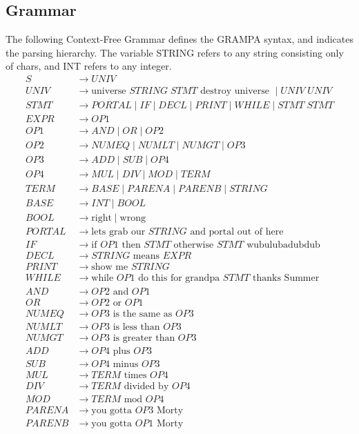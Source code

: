 \documentclass[numbers]{sigplanconf}
\begin{document}
\subsection*{Grammar}
The following Context-Free Grammar defines the GRAMPA syntax, and indicates the parsing hierarchy. The variable STRING refers to any string consisting only of chars, and INT refers to any integer.
\begin{align*}
	S &\rightarrow UNIV \\
	UNIV &\rightarrow \text{universe } STRING \; STMT \text{ destroy universe } \mid UNIV \; UNIV \\
	STMT &\rightarrow PORTAL \mid IF \mid DECL \mid PRINT \mid WHILE \mid STMT \; STMT \\
	EXPR &\rightarrow OP1 \\
	OP1 &\rightarrow AND \mid OR \mid OP2 \\
	OP2 &\rightarrow NUMEQ \mid NUMLT \mid NUMGT \mid OP3 \\
	OP3 &\rightarrow ADD \mid SUB \mid OP4 \\
	OP4 &\rightarrow MUL \mid DIV \mid MOD \mid TERM \\
	TERM &\rightarrow BASE \mid PARENA \mid PARENB \mid STRING \\
	BASE &\rightarrow INT \mid BOOL \\
	BOOL &\rightarrow \text{right} \mid \text{wrong} \\
	PORTAL &\rightarrow \text{lets grab our } STRING \text{ and portal out of here}\\
	IF &\rightarrow \text{if } OP1 \text{ then } STMT \text{ otherwise } STMT \text{ wubulubadubdub}\\
	DECL &\rightarrow STRING \text{ means } EXPR\\
	PRINT &\rightarrow \text{show me } STRING\\
	WHILE &\rightarrow \text{while } OP1 \text{ do this for grandpa } STMT \text{ thanks Summer}\\
	AND &\rightarrow OP2 \text{ and } OP1\\
	OR &\rightarrow OP2 \text{ or } OP1\\
	NUMEQ &\rightarrow OP3 \text{ is the same as } OP3 \\
	NUMLT &\rightarrow OP3 \text{ is less than } OP3\\
	NUMGT &\rightarrow OP3 \text{ is greater than } OP3\\
	ADD &\rightarrow OP4 \text{ plus } OP3\\
	SUB &\rightarrow OP4 \text{ minus } OP3\\
	MUL &\rightarrow TERM \text{ times } OP4\\
	DIV &\rightarrow TERM \text{ divided by } OP4\\
	MOD &\rightarrow TERM \text{ mod } OP4\\
	PARENA &\rightarrow \text{you gotta } OP3 \text{ Morty}\\
	PARENB &\rightarrow \text{you gotta } OP1 \text{ Morty}\\
\end{align*}
\end{document}
